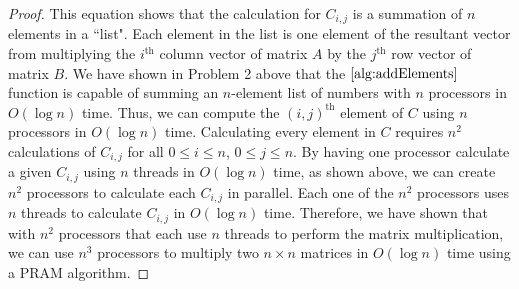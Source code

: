 \documentclass{article}
\renewcommand{\_}{\ifincsname_\else\legacyunderscore\fi}
\begin{document}
\begin{enumerate}
\begin{enumerate}
\begin{proof}
This equation shows that the calculation for $C_{i, j}$ is a summation of $n$ elements in a ``list". Each element in the list is one element of the resultant vector from multiplying the $i^{\text{th}}$ column vector of matrix $A$ by the $j^{\text{th}}$ row vector of matrix $B$. We have shown in Problem 2 above that the $\ref{alg:addElements}$ function is capable of summing an $n$-element list of numbers with $n$ processors in $O(\log n)$ time. Thus, we can compute the $(i, j)^{\text{th}}$ element of $C$ using $n$ processors in $O(\log n)$ time. Calculating every element in $C$ requires $n^2$ calculations of $C_{i, j}$ for all $0\leq i \leq n$, $0 \leq j \leq n$. By having one processor calculate a given $C_{i, j}$ using $n$ threads in $O(\log n)$ time, as shown above, we can create $n^2$ processors to calculate each $C_{i, j}$ in parallel. Each one of the $n^2$ processors uses $n$ threads to calculate $C_{i, j}$ in $O(\log n)$ time. Therefore, we have shown that with $n^2$ processors that each use $n$ threads to perform the matrix multiplication, we can use $n^3$ processors to multiply two $n\times n$ matrices in $O(\log n)$ time using a PRAM algorithm. \end{proof}
	\end{enumerate}

\end{enumerate}
\end{document}
